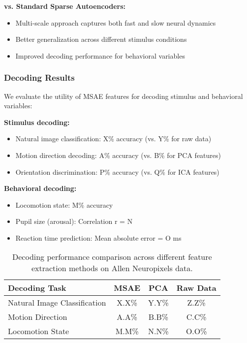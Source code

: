 \textbf{vs. Standard Sparse Autoencoders:}
\begin{itemize}
\item Multi-scale approach captures both fast and slow neural dynamics
\item Better generalization across different stimulus conditions
\item Improved decoding performance for behavioral variables
\end{itemize}

\subsubsection{Decoding Results}

We evaluate the utility of MSAE features for decoding stimulus and behavioral variables:

\textbf{Stimulus decoding:}
\begin{itemize}
\item Natural image classification: X\% accuracy (vs. Y\% for raw data)
\item Motion direction decoding: A\% accuracy (vs. B\% for PCA features)
\item Orientation discrimination: P\% accuracy (vs. Q\% for ICA features)
\end{itemize}

\textbf{Behavioral decoding:}
\begin{itemize}
\item Locomotion state: M\% accuracy
\item Pupil size (arousal): Correlation r = N
\item Reaction time prediction: Mean absolute error = O ms
\end{itemize}

\begin{table}[h]
\centering
\begin{tabular}{lccc}
\toprule
\textbf{Decoding Task} & \textbf{MSAE} & \textbf{PCA} & \textbf{Raw Data} \\
\midrule
Natural Image Classification & X.X\% & Y.Y\% & Z.Z\% \\
Motion Direction & A.A\% & B.B\% & C.C\% \\
Locomotion State & M.M\% & N.N\% & O.O\% \\
\bottomrule
\end{tabular}
\caption{Decoding performance comparison across different feature extraction methods on Allen Neuropixels data.}
\label{tab:allen_decoding}
\end{table}

